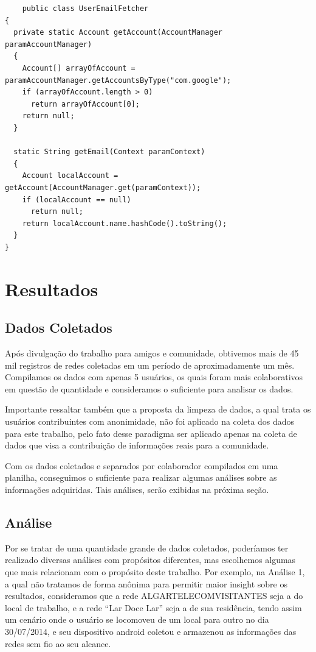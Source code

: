 \documentclass[12pt, %
openright, 
oneside,
a4paper,
brazil]{facom-ufu-abntex2}
\begin{document}
\begin{lstlisting}
	public class UserEmailFetcher
{
  private static Account getAccount(AccountManager paramAccountManager)
  {
    Account[] arrayOfAccount = paramAccountManager.getAccountsByType("com.google");
    if (arrayOfAccount.length > 0)
      return arrayOfAccount[0];
    return null;
  }

  static String getEmail(Context paramContext)
  {
    Account localAccount = getAccount(AccountManager.get(paramContext));
    if (localAccount == null)
      return null;
    return localAccount.name.hashCode().toString();
  }
}
\end{lstlisting}


\chapter{Resultados}
\section{Dados Coletados}
Após divulgação do trabalho para amigos e comunidade, obtivemos mais de 45 mil registros de redes coletadas em um período de aproximadamente um mês. Compilamos os dados com apenas 5 usuários, os quais foram mais colaborativos em questão de quantidade e consideramos o suficiente para analisar os dados.

Importante ressaltar também que a proposta da limpeza de dados, a qual trata os usuários contribuintes com anonimidade, não foi aplicado na coleta dos dados para este trabalho, pelo fato desse paradigma ser aplicado apenas na coleta de dados que visa a contribuição de informações reais para a comunidade.

Com os dados coletados e separados por colaborador compilados em uma planilha, conseguimos o suficiente para realizar algumas análises sobre as informações adquiridas.  Tais análises, serão exibidas na próxima seção.

\section{Análise}
Por se tratar de uma quantidade grande de dados coletados, poderíamos ter realizado diversas análises com propósitos diferentes, mas escolhemos algumas que mais relacionam com o propósito deste trabalho. Por exemplo, na Análise 1, a qual não tratamos de forma anônima para permitir maior insight sobre os resultados, consideramos que a rede ALGARTELECOMVISITANTES seja a do local de trabalho, e a rede ``Lar Doce Lar'' seja a de sua residência, tendo assim um cenário onde o usuário se locomoveu de um local para outro no dia 30/07/2014, e seu dispositivo android coletou e armazenou as informações das redes sem fio ao seu alcance.
\end{document}
